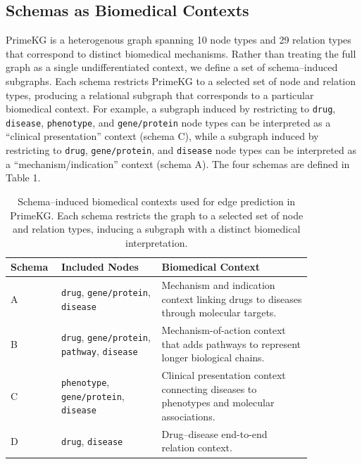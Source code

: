 \documentclass{article}
\theoremstyle{plain}
\theoremstyle{definition}
\theoremstyle{remark}
\begin{document}
\subsection{Schemas as Biomedical Contexts}

PrimeKG is a heterogenous graph spanning 10 node types and 29 relation types that correspond to distinct biomedical mechanisms. Rather than treating the full graph as a single undifferentiated context, we define a set of schema--induced subgraphs. Each schema restricts PrimeKG to a selected set of node and relation types, producing a relational subgraph that corresponds to a particular biomedical context. For example, a subgraph induced by restricting to \texttt{drug}, \texttt{disease}, \texttt{phenotype}, and \texttt{gene/protein} node types can be interpreted as a ``clinical presentation'' context (schema C), while a subgraph induced by restricting to \texttt{drug}, \texttt{gene/protein}, and \texttt{disease} node types can be interpreted as a ``mechanism/indication'' context (schema A). The four schemas are defined in Table 1.

\begin{table}[h]
\caption{Schema--induced biomedical contexts used for edge prediction in PrimeKG. Each schema restricts the graph to a selected set of node and relation types, inducing a subgraph with a distinct biomedical interpretation.}
\centering

\begin{tabular}{p{0.10\linewidth} p{0.30\linewidth} p{0.45\linewidth}}
\toprule
\textbf{Schema} & \textbf{Included Nodes} & \textbf{Biomedical Context} \\
\midrule
A & \texttt{drug}, \texttt{gene/protein}, \texttt{disease}
  & Mechanism and indication context linking drugs to diseases through molecular targets. \\
\midrule
B & \texttt{drug}, \texttt{gene/protein}, \texttt{pathway}, \texttt{disease}
  & Mechanism-of-action context that adds pathways to represent longer biological chains. \\
\midrule
C & \texttt{phenotype}, \texttt{gene/protein}, \texttt{disease}
  & Clinical presentation context connecting diseases to phenotypes and molecular associations. \\
\midrule
D & \texttt{drug}, \texttt{disease}
  & Drug--disease end-to-end relation context. \\
\bottomrule
\end{tabular}

\vspace{0.5em}
\label{tab:schemas}
\end{table}
\end{document}
